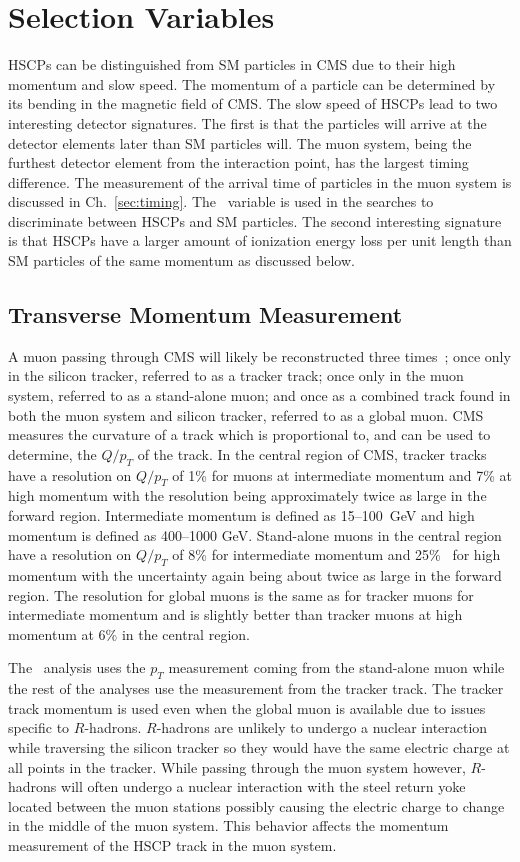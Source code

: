 \section{Selection Variables \label{sec:SelVar}}
HSCPs can be distinguished from SM particles in CMS due to their high momentum and slow speed.
The momentum of a particle can be determined by its bending in the magnetic field of CMS.
The slow speed of HSCPs lead to two interesting detector signatures. The first is that the particles will arrive at the detector elements later than SM particles will.
The muon system, being the furthest detector element from the interaction point, has the largest timing difference. The measurement of the arrival time of particles in the
muon system is discussed in Ch.~\ref{sec:timing}. The \invbeta\ variable is used in the searches to discriminate between HSCPs and SM particles.
The second interesting signature is that HSCPs have a larger amount of ionization energy loss per unit length 
than SM particles of the same momentum as discussed below.

\subsection{Transverse Momentum Measurement \label{sec:PMeasurement}}
A muon passing through CMS will likely be reconstructed three times~\cite{2012JInst...7P0002T}; once only in the silicon tracker, referred to as a tracker track;
once only in the muon system, referred to as a stand-alone muon; and once as a combined track found in both the muon system and silicon tracker, referred
to as a global muon. CMS measures the curvature of a track which is proportional to, and can be used to determine, the $Q/p_T$ of the track.
In the central region of CMS, tracker tracks have a resolution on $Q/p_T$ of 1\% for muons at intermediate momentum and 7\% at
high momentum with the resolution being approximately
twice as large in the forward region. Intermediate momentum is defined as 15--100~GeV and high momentum is defined as 400--1000 GeV.
Stand-alone muons in the central region have a resolution on $Q/p_T$ of 8\% for intermediate momentum and 25\%~\cite{2008AN097} for high momentum with the uncertainty again
being about twice as large in the forward region. The resolution for global muons is the same as for tracker muons for intermediate momentum and is slightly better
than tracker muons at high momentum at 6\% in the central region.

The \muononly\ analysis uses the $p_T$ measurement coming from the stand-alone muon while the rest of the analyses use the measurement from the tracker track.
The tracker track momentum is used even when the global muon is available due to issues specific to $R$-hadrons.
$R$-hadrons are unlikely to undergo a nuclear interaction while traversing the silicon tracker so they would have the same electric charge at all points in the tracker.
While passing through the muon system however, $R$-hadrons will often undergo a nuclear interaction with the steel return yoke located between the muon stations
possibly causing the electric charge to change in the middle of the muon system. This behavior affects the momentum measurement of the HSCP track in the muon system.


